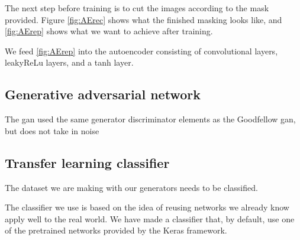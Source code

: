 The next step before training is to cut the images according to the mask provided. Figure \ref{fig:AErec} shows what the finished masking looks like, and \ref{fig:AErep} shows what we want to achieve after training.

We feed \ref{fig:AErep} into the autoencoder consisting of convolutional layers, leakyReLu layers, and a tanh layer.


\subsection{Generative adversarial network}
The gan used the same generator discriminator elements as the Goodfellow gan, but does not take in noise


\subsection{Transfer learning classifier}
The dataset we are making with our generators needs to be classified. 

The classifier we use is based on the idea of reusing networks we already know apply well to the real world.
We have made a classifier that, by default, use one of the pretrained networks provided by the Keras framework.

